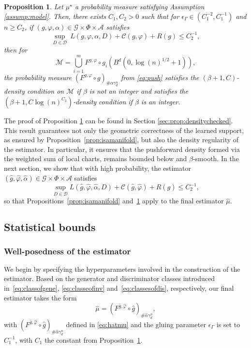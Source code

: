 \documentclass[10pt]{article}
\newtheorem{proposition}{Proposition}
\begin{document}
\begin{proposition}\label{prop:densitychecked}
 Let $\mu^\star$ a probability measure satisfying Assumption \ref{assump:model}. Then, there exists $C_1,C_2>0$ such that for $\epsilon_\Gamma \in (C_1^{-2},C_1^{-1})$ and $n\geq C_2$, if $(g,\varphi,\alpha)\in \mathcal{G}\times  \Phi\times \mathcal{A}$ satisfies $$\sup_{D\in \mathcal{D}} \ L(g,\varphi,\alpha,D)+\mathcal{C}(g,\varphi)+R(g)\leq C_2^{-1} ,$$ then for  $$\mathcal{M}=\bigcup_{i=1}^m F^{g,\varphi}\circ g_{i}(B^d(0,\log(n)^{1/2}+1)),$$
 the probability measure $(F^{g,\varphi}\circ g)_{\# \alpha\gamma_d^n}$ from \eqref{eq:push} satisfies the $(\beta+1,C)$-density condition  on $\mathcal{M}$ if $\beta$ is not an integer and satisfies the $(\beta+1,C\log(n)^{C_2})$-density condition if $\beta$ is  an integer.
\end{proposition}
The proof of Proposition \ref{prop:densitychecked} can be found in Section \ref{sec:prop:densitychecked}. This result guarantees not only the geometric correctness of the learned support, as ensured by Proposition~\ref{prop:isamanifold}, but also the density regularity of the estimator. In particular, it ensures that the pushforward density formed via the weighted sum of local charts, remains bounded below and $\beta$-smooth. In the next section, we show that with high probability, the estimator \( (\hat{g}, \hat{\varphi}, \hat{\alpha}) \in \mathcal{G} \times \Phi \times \mathcal{A} \) satisfies
\[
\sup_{D \in \mathcal{D}} L(\hat{g}, \hat{\varphi}, \hat{\alpha}, D) + \mathcal{C}(\hat{g}, \hat{\varphi}) + R(\hat{g}) \leq C_2^{-1},
\]
so that Propositions~\ref{prop:isamanifold} and~\ref{prop:densitychecked} apply to the final estimator \( \hat{\mu} \). 




\subsection{Statistical bounds}\label{sec:statisticalbound}
\subsubsection{Well-posedness of the estimator}
We begin by specifying the hyperparameters involved in the construction of the estimator. Based on the generator and discriminator classes introduced in~\eqref{eq:classofgene}, \eqref{eq:classeofinv} and~\eqref{eq:classesofdis}, respectively, our final estimator takes the form
\begin{equation}\label{eq:finalest}
   \hat{\mu} =  (F^{\hat{g},\hat{\varphi}}\circ \hat{g})_{\# \hat{\alpha}\gamma_d^n},
\end{equation}
with $(F^{\hat{g},\hat{\varphi}}\circ \hat{g})_{\# \hat{\alpha}\gamma_d^n}$ defined in \eqref{eq:hatmu} and the gluing parameter \( \epsilon_\Gamma\) is set to \( C_1^{-1} \), with \( C_1 \) the constant from Proposition~\ref{prop:densitychecked}. 
\end{document}
